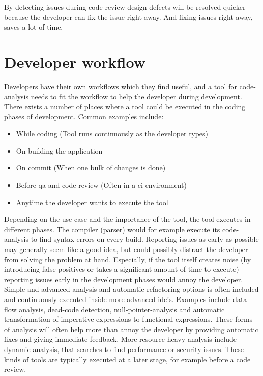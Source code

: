 \documentclass{report}
\begin{document}
By detecting issues during code review design defects will be resolved quicker because the developer can fix the issue right away. And fixing issues right away, saves a lot of time.

\section{Developer workflow}

Developers have their own workflows which they find useful, and a tool for code-analysis needs to fit the workflow to help the developer during development. There exists a number of places where a tool could be executed in the coding phases of development. Common examples include:
\begin{itemize}
    \item While coding (Tool runs continuously as the developer types)
    \item On building the application 
    \item On commit (When one bulk of changes is done)
    \item Before \gls{qa} and code review (Often in a \gls{ci} environment)
    \item Anytime the developer wants to execute the tool
\end{itemize}

Depending on the use case and the importance of the tool, the tool executes in different phases. The compiler (parser) would for example execute its code-analysis to find syntax errors on every build. Reporting issues as early as possible may generally seem like a good idea, but could possibly distract the developer from solving the problem at hand. Especially, if the tool itself creates noise (by introducing false-positives or takes a significant amount of time to execute) reporting issues early in the development phases would annoy the developer. Simple and advanced analysis and automatic refactoring options is often included and continuously executed inside more advanced \gls{ide}'s. Examples include data-flow analysis, dead-code detection, null-pointer-analysis and automatic transformation of imperative expressions to functional expressions. These forms of analysis will often help more than annoy the developer by providing automatic fixes and giving immediate feedback. More resource heavy analysis include dynamic analysis, that searches to find performance or security issues. These kinds of tools are typically executed at a later stage, for example before a code review.
\end{document}
